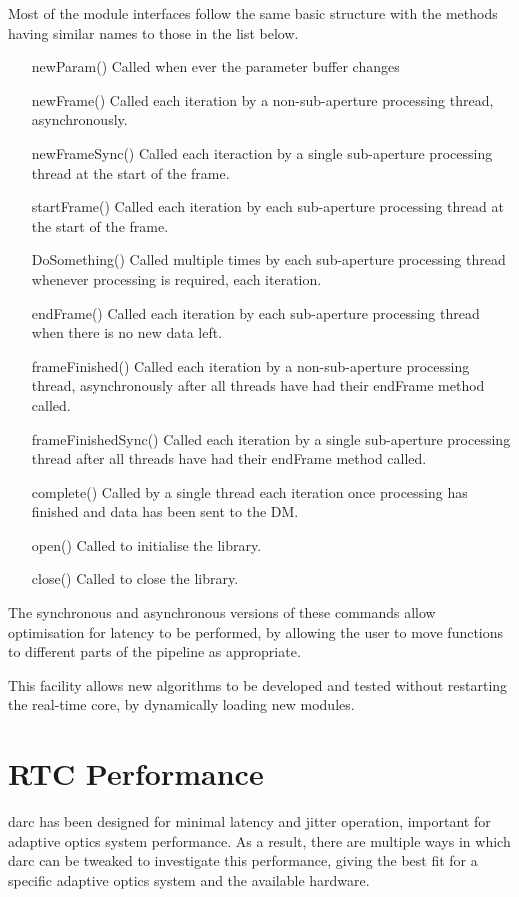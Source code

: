 \documentclass[a4,10pt]{article}
\begin{document}
Most of the module interfaces follow the same basic structure with the
methods having similar names to those in the list below.

\begin{itemize}
\item[newParam()] Called when ever the parameter buffer changes
\item[newFrame()] Called each iteration by a non-sub-aperture processing thread,
  asynchronously.
\item[newFrameSync()] Called each iteraction by a single sub-aperture
  processing thread at the start of the frame.
\item[startFrame()] Called each iteration by each sub-aperture
  processing thread at the start of the frame.
\item[DoSomething()] Called multiple times by each sub-aperture
  processing thread whenever processing is required, each iteration.
\item[endFrame()] Called each iteration by each sub-aperture
  processing thread when there is no new data left.
\item[frameFinished()] Called each iteration by a non-sub-aperture
  processing thread, asynchronously after all threads have had their
  endFrame method called.
\item[frameFinishedSync()] Called each iteration by a single sub-aperture
  processing thread after all threads have had their endFrame method
  called.
\item[complete()] Called by a single thread each iteration once
  processing has finished and data has been sent to the DM.
\item[open()] Called to initialise the library.
\item[close()] Called to close the library.
\end{itemize}

The synchronous and asynchronous versions of these commands allow
optimisation for latency to be performed, by allowing the user to move
functions to different parts of the pipeline as appropriate.

This facility allows new algorithms to be developed and tested without
restarting the real-time core, by dynamically loading new modules.


\section{RTC Performance}
darc has been designed for minimal latency and jitter operation, important for
adaptive optics system performance.  As a result, there are multiple
ways in which darc can be tweaked to investigate this performance,
giving the best fit for a specific adaptive optics system and the
available hardware.
\end{document}
